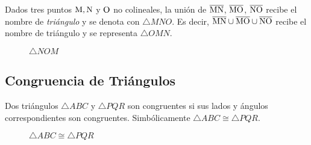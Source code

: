 \begin{definition}
    Dados tres puntos $\rm M,N$ y $\rm O$ no colineales, la unión de $\overline{\rm MN}$, $\overline{\rm MO}$, $\overline{\rm NO}$ recibe el nombre de \textit{triángulo} y se denota con $\triangle{MNO}$. Es decir, $\overline{\rm MN} \cup \overline{\rm MO} \cup \overline{\rm NO}$ recibe el nombre de triángulo y se representa $\triangle{OMN}$.

    \begin{figure}[!h]
        \centering
        
        \caption{$\triangle{NOM}$}
        \label{fig:triangle}
    \end{figure}
    
\end{definition}

\subsection{Congruencia de Triángulos}

\begin{definition}
    Dos triángulos $\triangle{ABC}$ y $\triangle{PQR}$ son congruentes si sus lados y ángulos correspondientes son congruentes. Simbólicamente $\triangle{ABC} \cong \triangle{PQR}$.

    \begin{figure}[h!]

        \centering

        \begin{subfigure}[b]{.5\textwidth}
            \centering
            
            \label{fig:triag-congruence-1}
        \end{subfigure}%
        \begin{subfigure}[b]{.5\textwidth}
            \centering
            
            \label{fig:triag-congruence-2}
        \end{subfigure}

        \centering
        \caption{$\triangle{ABC} \cong \triangle{PQR}$}
        \label{fig:triang-congruence}
        
    \end{figure}    
    
\end{definition}

